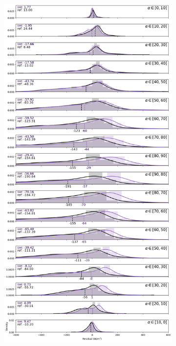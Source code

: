 \begin{figure}[htb!]
\begin{subfigure}{\columnwidth}
    \end{subfigure}
\medskip
    \begin{subfigure}{\columnwidth}
        \includegraphics[width=\columnwidth]{figures/first_study/residual_errors_svr_site3_mae.png}

\end{subfigure}
\end{figure}
